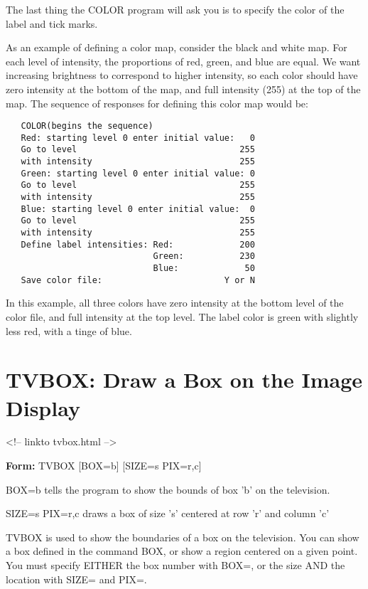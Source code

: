 The last thing the COLOR program will ask you is to specify the color of
the label and tick marks.

As an example of defining a color map, consider the black and white map.
For each level of intensity, the proportions of red, green, and blue are
equal.  We want increasing brightness to correspond to higher intensity, so
each color should have zero intensity at the bottom of the map, and full
intensity (255) at the top of the map.  The sequence of responses for
defining this color map would be:
\begin{verbatim}
   COLOR(begins the sequence)
   Red: starting level 0 enter initial value:   0
   Go to level                                255
   with intensity                             255
   Green: starting level 0 enter initial value: 0
   Go to level                                255
   with intensity                             255
   Blue: starting level 0 enter initial value:  0
   Go to level                                255
   with intensity                             255
   Define label intensities: Red:             200
                             Green:           230
                             Blue:             50
   Save color file:                        Y or N
\end{verbatim}

In this example, all three colors have zero intensity at the bottom level
of the color file, and full intensity at the top level.  The label color is
green with slightly less red, with a tinge of blue.

\section{TVBOX: Draw a Box on the Image Display}
\begin{rawhtml}
<!-- linkto tvbox.html -->
\end{rawhtml}
\begin{command}
  \item[\textbf{Form: } TVBOX {[BOX=b]} {[SIZE=s PIX=r,c]}\hfill]{}
  \item[BOX=b]{tells the program to show the bounds
       of box 'b' on the television.}
  \item[SIZE=s PIX=r,c]{draws a box of size 's' centered at row 
       'r' and column 'c'}
\end{command}

TVBOX is used to show the boundaries of a box on the television.  You can
show a box defined in the command BOX, or show a region centered on a given
point.  You must specify EITHER the box number with BOX=, or the size AND
the location with SIZE= and PIX=.

